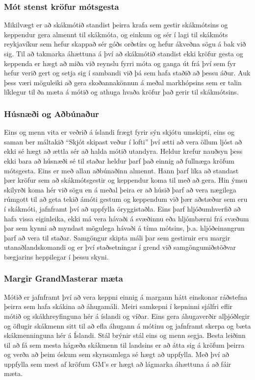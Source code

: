 \documentclass[11pt]{article}
\begin{document}
\subsubsection{Mót stenst kröfur mótsgesta}
\label{sec-1-2-1}


  Mikilvægt er að skákmótið standist þeirra krafa sem gestir skákmótsins og keppendur gera almennt
til skákmóta, og einkum og sér í lagi til skákmóts reykjavíkur sem hefur skappað sér góðs orðstírs
og hefur ákveðna sögu á bak við sig.
 Til að takmarka áhættuna á því að skákmótið standist ekki kröfur gesta og keppenda er hægt að miða
við reynslu fyrri móta og ganga út frá því sem fyr hefur verið gert og setja sig í sambandi við þá sem
hafa staðið að þessu áður.  Auk þess væri möguleiki að gera skoðannakönnun á meðal markhópsins sem er
talin líklegur til ða mæta á mótið og athuga hvaða kröfur það gerir til skákmótsins.
\subsubsection{Húsnæði og Aðbúnaður}
\label{sec-1-2-2}


  Eins og menn vita er veðrið á íslandi frægt fyrir sýn skjótu umskipti, eins og saman ber máltakið 
``Skjót skipast veður í lofti'' því ætti að vera öllum ljóst að ekki sé hægt að ættla sér að halda mótið
utandyra. Heldur krefur nauðsyn þess ekki bara að húsnæði sé til staðar heldur þarf það einnig að 
fullnæga kröfum mótsgesta.  Eins er með allan aðbúnaðinn almennt. Hann þarf líka að standast þær kröfur 
sem að skákmótsgestir og keppendur koma til með að gera.  Hin ýmsu skilyrði koma hér við sögu en á meðal
þeira er að húsið þarf að vera nægilega rúmgott til að geta tekið ámóti gestum og keppendum við þær 
aðstæður sem eru í skákmóti, jafnframt því að uppfylla öryggistaðla.  Eins þarf hljóðumhverfið að hafa 
vissa eiginleika, ekki má vera hávaði á svæðinnu eða hljómbærni frá svæðum þar sem kynni að myndast 
mögulega hávaði á tíma mótsins, þ.a. hljóðeinangrun þarf að vera til staðar.  Samgöngur skipta máli þar 
sem gestirnir eru margir utanaðlandskomandi og er því staðsetningar í grend við samgöngumiðstöðvar 
bægjarins heppilegar í þessu skyni.
  
\subsubsection{Margir GrandMasterar mæta}
\label{sec-1-2-3}


  Mótið er jafnframt því að vera keppni einnig á margann hátt einskonar ráðstefna þeirra sem hafa 
skákina að áhugamáli.  Meiri samkepni í kepninni sjálfri eflir mótið og skákhreyfinguna hér á íslandi
og víðar.  Eins gera áhugaverðir alþjóðlegir og öflugir skákmenn sitt til að efla áhugann á mótinu og 
jafnframt skerpa og bæta skákmenninguna hér á Íslandi.  Stál brýnir stál eins og menn segja.
  Besta leiðinn til að fá sem mesta hágæða skákmenn til landsins er að átta sig á kröfum þeirra og 
verða að þeim óskum sem skynsamlega sé hægt að uppfylla.  Með því að uppfylla sem mest af kröfum GM's 
er hægt að lágmarka áhættuna á að fáir mæta.
\end{document}
